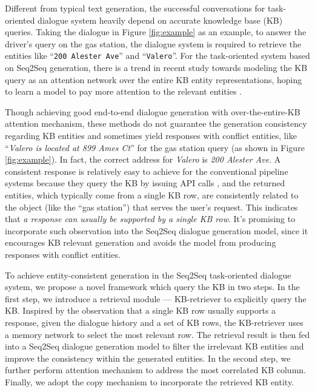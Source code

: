 \documentclass[11pt,a4paper]{article}
\begin{document}
Different from typical text generation, 
the successful conversations for task-oriented dialogue system heavily depend on accurate
knowledge base (KB) queries.
Taking the dialogue in Figure \ref{fig:example} as an example, to answer the driver's query on the gas station, the dialogue system is required to
retrieve the entities like ``\texttt{200 Alester Ave}'' and ``\texttt{Valero}''.
For the task-oriented system based on Seq2Seq generation, 
there is a trend in recent study towards 
modeling the KB
query as an attention network over
the entire KB entity representations,
hoping to learn a model to pay more attention to the relevant entities \cite{eric:2017:SIGDial,madotto2018mem2seq,reddy2018multi,wen2018sequence}.

Though achieving good end-to-end dialogue generation with over-the-entire-KB attention mechanism,
these methods do not guarantee
the generation consistency regarding KB entities
and sometimes yield responses with conflict entities,
like ``\textit{Valero is located at 899 Ames Ct}'' for the gas station query (as shown in Figure \ref{fig:example}). 
In fact, the correct address for \textit{Valero} is \textit{200 Alester Ave}.
A consistent response is relatively easy
to achieve for the conventional pipeline systems
because they query the KB by issuing API calls \cite{bordes-weston:2017:ICLR,wen:2017:EACL,wen:2017:ICML},
and the returned 
entities, which typically come from a single KB row,
are consistently related
to the object (like the ``gas station'')
that serves the user's request.
This indicates that \textit{a response can usually be supported by a single KB row}.
It's promising to incorporate such observation into
the Seq2Seq dialogue generation model,
since it encourages KB relevant generation and 
avoids the model from
producing responses with conflict entities.

To achieve entity-consistent generation in the Seq2Seq task-oriented dialogue system,
we propose a novel framework which query the KB in two steps.
In the first step, we introduce a retrieval module --- KB-retriever to explicitly query the KB.
Inspired by the observation that a single KB row usually supports a response,
given the dialogue history and a set of KB rows,
the KB-retriever uses a memory network \cite{sukhbaatar2015end}
to select the
most relevant row.
The retrieval result is then fed into a Seq2Seq dialogue generation model 
to filter the irrelevant KB entities and improve the consistency within the generated entities.
In the second step, we further perform attention mechanism to address the most correlated KB column.
Finally, we adopt the copy mechanism to incorporate the retrieved KB entity.
\end{document}
